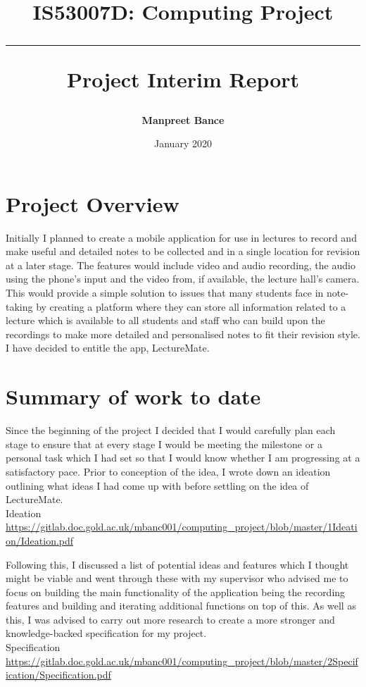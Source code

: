 \documentclass{report}
\title{\textbf{IS53007D: Computing Project} \vspace{0.5cm} \hrule \vspace{0.5cm} Project Interim Report}
\date{January 2020}
\author{\textbf{Manpreet Bance}}
\begin{document}
\maketitle


\chapter*{Project Overview}
\par Initially I planned to create a mobile application for use in lectures to record and make useful and detailed notes to be collected and in a single location for revision at a later stage. The features would include video and audio recording, the audio using the phone's input and the video from, if available, the lecture hall's camera. This would provide a simple solution to issues that many students face in note-taking by creating a platform where they can store all information related to a lecture which is available to all students and staff who can build upon the recordings to make more detailed and personalised notes to fit their revision style. I have decided to entitle the app, LectureMate. 

\chapter*{Summary of work to date}
\par Since the beginning of the project I decided that I would carefully plan each stage to ensure that at every stage I would be meeting the milestone or a personal task which I had set so that I would know whether I am progressing at a satisfactory pace. Prior to conception of the idea, I wrote down an ideation outlining what ideas I had come up with before settling on the idea of LectureMate.\\  Ideation \url{https://gitlab.doc.gold.ac.uk/mbanc001/computing_project/blob/master/1Ideation/Ideation.pdf}\\

\par Following this, I discussed a list of potential ideas and features which I thought might be viable and went through these with my supervisor who advised me to focus on building the main functionality of the application being the recording features and building and iterating additional functions on top of this. As well as this, I was advised to carry out more research to create a more stronger and knowledge-backed specification for my project.\\ Specification \url{https://gitlab.doc.gold.ac.uk/mbanc001/computing_project/blob/master/2Specification/Specification.pdf}\\
\end{document}
